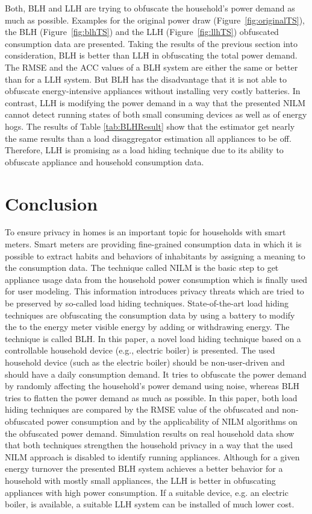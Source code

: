 \documentclass{article}
\begin{document}
Both, \ac{BLH} and \ac{LLH} are trying to obfuscate the household's power demand as much as possible. 
Examples for the original power draw (Figure~\ref{fig:originalTS}), the \ac{BLH} (Figure~\ref{fig:blhTS}) and the \ac{LLH} (Figure~\ref{fig:llhTS}) obfuscated consumption data are presented.
Taking the results of the previous section into consideration, \ac{BLH} is better than \ac{LLH} in obfuscating the total power demand. The \ac{RMSE} and the \ac{ACC} values of a \ac{BLH} system are either the same or better than for a \ac{LLH} system.
But \ac{BLH} has the disadvantage that it is not able to obfuscate energy-intensive appliances without installing very costly batteries.
In contrast, \ac{LLH} is modifying the power demand in a way that the presented \ac{NILM} cannot detect running states of both small consuming devices as well as of energy hogs. 
The results of Table \ref{tab:BLHResult} show that the estimator get nearly the same results than a load disaggregator estimation all appliances to be off. 
Therefore, \ac{LLH} is promising as a load hiding technique due to its ability to obfuscate appliance and household consumption data.
\section{Conclusion}\label{sec:conclusion}
To ensure privacy in homes is an important topic for households with smart meters.
Smart meters are providing fine-grained consumption data in which it is possible to extract habits and behaviors of inhabitants by assigning a meaning to the consumption data.
The technique called \acf{NILM} is the basic step to get appliance usage data from the household power consumption which is finally used for user modeling. 
This information introduces privacy threats which are tried to be preserved by so-called load hiding techniques.
State-of-the-art load hiding techniques are obfuscating the consumption data by using a battery to modify the to the energy meter visible energy by adding or withdrawing energy.
The technique is called \acf{BLH}. 
In this paper, a novel load hiding technique based on a controllable household device (e.g., electric boiler) is presented. 
The used household device (such as the electric boiler) should be non-user-driven and should have a daily consumption demand.
It tries to obfuscate the power demand by randomly affecting the household's power demand using noise, whereas \ac{BLH} tries to flatten the power demand as much as possible.
In this paper, both load hiding techniques are compared by the \ac{RMSE} value of the obfuscated and non-obfuscated power consumption and by the applicability of \ac{NILM} algorithms on the obfuscated power demand.
Simulation results on real household data show that both techniques strengthen the household privacy in a way that the used \ac{NILM} approach is disabled to identify running appliances.
Although for a given energy turnover the presented \ac{BLH} system achieves a better behavior for a household with mostly small appliances, the \ac{LLH} is better in obfuscating appliances with high power consumption.
If a suitable device, e.g. an electric boiler, is available, a suitable \ac{LLH} system can be installed of much lower cost.


\end{document}
